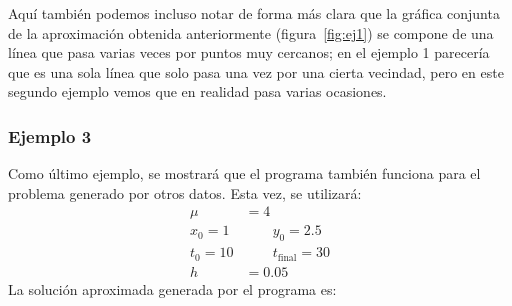 Aquí también podemos incluso notar de forma más clara que la gráfica conjunta de la aproximación obtenida anteriormente (figura~\ref{fig:ej1}) se compone de una línea que pasa varias veces por puntos muy cercanos; en el ejemplo 1 parecería que es una sola línea que solo pasa una vez por una cierta vecindad, pero en este segundo ejemplo vemos que en realidad pasa varias ocasiones.

\subsubsection{Ejemplo 3}

Como último ejemplo, se mostrará que el programa también funciona para el problema generado por otros datos. Esta vez, se utilizará:
\begin{align*}
    \mu &= 4 \\
    x_{0} = 1 &\qquad y_{0} = 2.5 \\
    t_{0} = 10 &\qquad t_{\text{final}} = 30 \\
    h &= 0.05
\end{align*}
La solución aproximada generada por el programa es:
